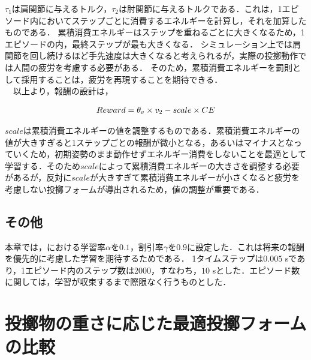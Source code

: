 $\tau_{1}$は肩関節に与えるトルク，$\tau_{2}$は肘関節に与えるトルクである．これは，1エピソード内においてステップごとに消費するエネルギーを計算し，それを加算したものである．
累積消費エネルギーはステップを重ねるごとに大きくなるため，1エピソードの内，最終ステップが最も大きくなる．
シミュレーション上では肩関節を回し続けるほど手先速度は大きくなると考えられるが，実際の投擲動作では人間の疲労を考慮する必要がある．
そのため，累積消費エネルギーを罰則として採用することは，疲労を再現することを期待できる．\\
　以上より，報酬の設計は，

\begin{eqnarray}
  \equlabel{2.26}
  Reward = \theta_{v} \times v_{2} - scale \times CE
\end{eqnarray}

$scale$は累積消費エネルギーの値を調整するものである．累積消費エネルギーの値が大きすぎると1ステップごとの報酬が微小となる，あるいはマイナスとなっていくため，初期姿勢のまま動作せずエネルギー消費をしないことを最適として学習する．そのため$scale$によって累積消費エネルギーの大きさを調整する必要があるが，反対に$scale$が大きすぎて累積消費エネルギーが小さくなると疲労を考慮しない投擲フォームが導出されるため，値の調整が重要である．
\subsection{その他}
本章では，における学習率$\alpha$を$0.1$，割引率$\gamma$を$0.9$に設定した．これは将来の報酬を優先的に考慮した学習を期待するためである．
1タイムステップは$0.005$ sであり，1エピソード内のステップ数は2000，すなわち，$10$ sとした．エピソード数に関しては，学習が収束するまで際限なく行うものとした．
\section{投擲物の重さに応じた最適投擲フォームの比較}
